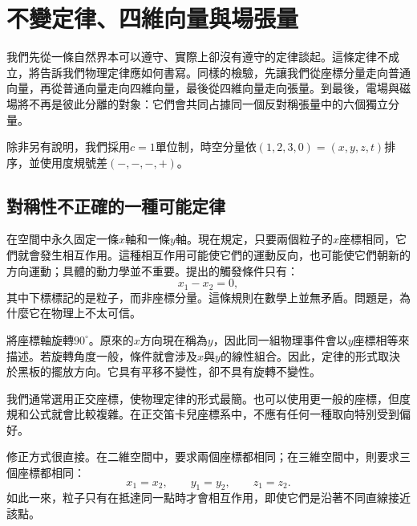 \chapter{不變定律、四維向量與場張量}

我們先從一條自然界本可以遵守、實際上卻沒有遵守的定律談起。這條定律不成立，將告訴我們物理定律應如何書寫。同樣的檢驗，先讓我們從座標分量走向普通向量，再從普通向量走向四維向量，最後從四維向量走向張量。到最後，電場與磁場將不再是彼此分離的對象：它們會共同占據同一個反對稱張量中的六個獨立分量。

除非另有說明，我們採用\(c=1\)單位制，時空分量依\((1,2,3,0)=(x,y,z,t)\)排序，並使用度規號差\((-,-,-,+)\)。

\section{對稱性不正確的一種可能定律}

在空間中永久固定一條\(x\)軸和一條\(y\)軸。現在規定，只要兩個粒子的\(x\)座標相同，它們就會發生相互作用。這種相互作用可能使它們的運動反向，也可能使它們朝新的方向運動；具體的動力學並不重要。提出的觸發條件只有：
\begin{equation}
  x_1-x_2=0,
\end{equation}
其中下標標記的是粒子，而非座標分量。這條規則在數學上並無矛盾。問題是，為什麼它在物理上不太可信。

\begin{classroomqa}
\end{classroomqa}

將座標軸旋轉\(90^\circ\)。原來的\(x\)方向現在稱為\(y\)，因此同一組物理事件會以\(y\)座標相等來描述。若旋轉角度一般，條件就會涉及\(x\)與\(y\)的線性組合。因此，定律的形式取決於黑板的擺放方向。它具有平移不變性，卻不具有旋轉不變性。

我們通常選用正交座標，使物理定律的形式最簡。也可以使用更一般的座標，但度規和公式就會比較複雜。在正交笛卡兒座標系中，不應有任何一種取向特別受到偏好。

修正方式很直接。在二維空間中，要求兩個座標都相同；在三維空間中，則要求三個座標都相同：
\begin{equation}
  x_1=x_2,
  \qquad y_1=y_2,
  \qquad z_1=z_2.
\end{equation}
如此一來，粒子只有在抵達同一點時才會相互作用，即使它們是沿著不同直線接近該點。


